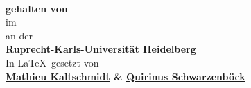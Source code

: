 
\begin{titlepage}
	\begin{center}
		\makeatletter
		
		\thispagestyle{empty}
		
		\Huge\textbf{\@title} \\
		\vspace{5mm}
		\Large\textbf{ gehalten von \@author} \\
		\large{im \@date} \\
		\vspace{5mm}
		\large{an der} \\
		\Large\textbf{Ruprecht-Karls-Universität Heidelberg} \\
		\vfill
	    \vfill
		\Large
		In \LaTeX \ gesetzt von \\ 
		\vspace{3mm}
		\bfseries{
		\href{mailto:M.Kaltschmidt@stud.uni-heidelberg.de}{Mathieu Kaltschmidt} 
		\& 
		\href{mailto:quirin.s@icloud.com}{Quirinus Schwarzenböck}}\\ 	
		\makeatother
	\end{center}
\blankpage
\end{titlepage}
